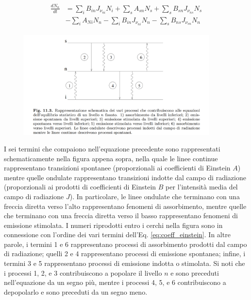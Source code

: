 \begin{eqnarray}
  \begin{split}
    \frac{dN_n}{dt}&=\sum_{i}B_{in}J_{{\nu}_{ni}}N_i + \sum_{s}A_{sn}N_s + \sum_{s}B_{sn}J_{{\nu}_{ns}}N_s\\
    & - \sum_{i}A_{Ni}N_n - \sum_{i}B_{in}J_{{\nu}_{ni}}N_n - \sum_{s} B_{ns} J_{\nu_{sn}} N_n
  \end{split}
  \label{eq:coeff_einstein}
\end{eqnarray}

\begin{figure}[H]
  \centering
  \includegraphics[width=0.9\textwidth]{immagini/processi_popolazione_livello_n.png}
\end{figure}

I sei termini che compaiono nell'equazione precedente sono rappresentati schematicamente nella figura appena sopra, nella quale le linee continue rappresentano transizioni spontanee (proporzionali ai coefficienti di Einstein $A$) mentre quelle ondulate rappresentano transizioni indotte dal campo di radiazione (proporzionali ai prodotti di coefficienti di Einstein $B$ per l'intensità media del campo di radiazione $J$). In particolare, le linee ondulate che terminano con una freccia diretta verso l'alto rappresentano fenomeni di assorbimento, mentre quelle che terminano con una freccia diretta verso il basso rappresentano fenomeni di emissione stimolata. I numeri riprodotti entro i cerchi nella figura sono in connessione con l'ordine dei vari termini dell'Eq. \eqref{eq:coeff_einstein}. In altre parole, i termini 1 e 6 rappresentano processi di assorbimento prodotti dal campo di radiazione; quelli 2 e 4 rappresentano processi di emissione spontanea; infine, i termini 3 e 5 rappresentano processi di emissione indotta o stimolata. Si noti che i processi 1, 2, e 3 contribuiscono a popolare il livello $n$ e sono preceduti nell'equazione da un segno più, mentre i processi 4, 5, e 6 contribuiscono a depopolarlo e sono preceduti da un segno meno.





